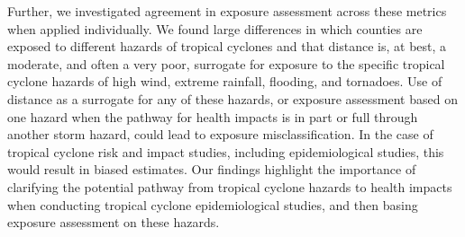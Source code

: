 Further, we investigated agreement in exposure assessment across these metrics
when applied individually. We found large differences in which counties are
exposed to different hazards of tropical cyclones and that distance is, at
best, a moderate, and often a very poor, surrogate for exposure to the specific
tropical cyclone hazards of high wind, extreme rainfall, flooding, and
tornadoes. Use of distance as a surrogate for any of these hazards, or exposure
assessment based on one hazard when the pathway for health impacts is in part
or full through another storm hazard, could lead to exposure misclassification.
In the case of tropical cyclone risk and impact studies, including
epidemiological studies, this would result in biased estimates.  Our findings
highlight the importance of clarifying the potential pathway from tropical
cyclone hazards to health impacts when conducting tropical cyclone
epidemiological studies, and then basing exposure assessment on these hazards.

